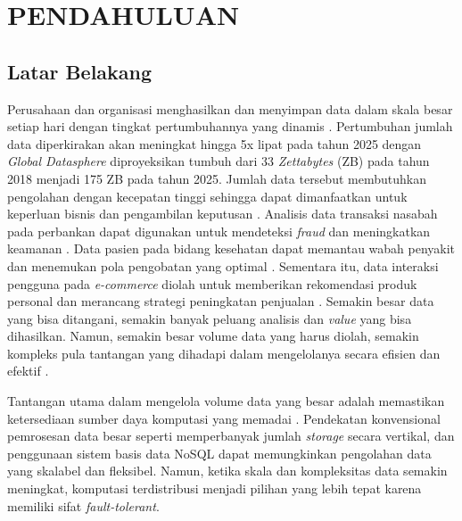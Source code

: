 \chapter{PENDAHULUAN}

\section{Latar Belakang}

Perusahaan dan organisasi menghasilkan dan menyimpan data dalam skala besar setiap hari dengan tingkat pertumbuhannya yang dinamis \cite{samadiPerformanceComparisonHadoop2018}. Pertumbuhan jumlah data diperkirakan akan meningkat hingga 5x lipat pada tahun 2025 dengan \textit{Global Datasphere} diproyeksikan tumbuh dari 33 \textit{Zettabytes} (ZB) pada tahun 2018 menjadi 175 ZB \cite{reinselDigitizationWorldEdge2018} pada tahun 2025. Jumlah data tersebut membutuhkan pengolahan dengan kecepatan tinggi sehingga dapat dimanfaatkan untuk keperluan bisnis dan pengambilan keputusan \cite{adrianExpertReviewBig2018}. Analisis data transaksi nasabah pada perbankan dapat digunakan untuk mendeteksi \textit{fraud} dan meningkatkan keamanan \cite{syahputraPendeteksianFraudPeran2020}. Data pasien pada bidang kesehatan dapat memantau wabah penyakit dan menemukan pola pengobatan yang optimal \cite{sulaimanLITERATUREREVIEWPENERAPAN2023}. Sementara itu, data interaksi pengguna pada \textit{e-commerce} diolah untuk memberikan rekomendasi produk personal dan merancang strategi peningkatan penjualan \cite{fernandoUtilizationBigData2020}. Semakin besar data yang bisa ditangani, semakin banyak peluang analisis dan \textit{value} yang bisa dihasilkan. Namun, semakin besar volume data yang harus diolah, semakin kompleks pula tantangan yang dihadapi dalam mengelolanya secara efisien dan efektif \cite{KOMPARASIKECEPATANHADOOP}.


Tantangan utama dalam mengelola volume data yang besar adalah memastikan ketersediaan sumber daya komputasi yang memadai \cite{KOMPARASIKECEPATANHADOOP}. Pendekatan konvensional pemrosesan data besar seperti memperbanyak jumlah \textit{storage} secara vertikal, dan penggunaan sistem basis data NoSQL dapat memungkinkan pengolahan data yang skalabel dan fleksibel. Namun, ketika skala dan kompleksitas data semakin meningkat, komputasi terdistribusi menjadi pilihan yang lebih tepat karena memiliki sifat \textit{fault-tolerant}\cite{saadoonFaultToleranceBig2022}. 

